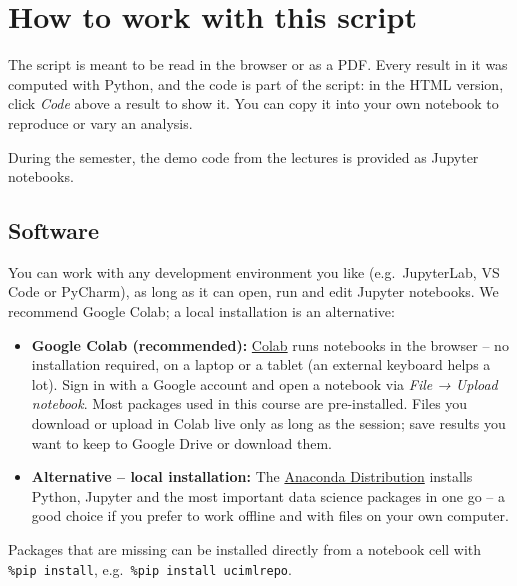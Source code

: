 \documentclass[
  letterpaper,
  DIV=11,
  numbers=noendperiod]{scrreprt}
\providecommand{\tightlist}{%
  \setlength{\itemsep}{0pt}\setlength{\parskip}{0pt}}\usepackage{longtable,booktabs,array}
\begin{document}
\section*{How to work with this
script}\label{how-to-work-with-this-script}


The script is meant to be read in the browser or as a PDF. Every result
in it was computed with Python, and the code is part of the script: in
the HTML version, click \emph{Code} above a result to show it. You can
copy it into your own notebook to reproduce or vary an analysis.

During the semester, the demo code from the lectures is provided as
Jupyter notebooks.

\subsection*{Software}\label{software}

You can work with any development environment you like (e.g.~JupyterLab,
VS Code or PyCharm), as long as it can open, run and edit Jupyter
notebooks. We recommend Google Colab; a local installation is an
alternative:

\begin{itemize}
\tightlist
\item
  \textbf{Google Colab (recommended):}
  \href{https://colab.research.google.com}{Colab} runs notebooks in the
  browser -- no installation required, on a laptop or a tablet (an
  external keyboard helps a lot). Sign in with a Google account and open
  a notebook via \emph{File → Upload notebook}. Most packages used in
  this course are pre-installed. Files you download or upload in Colab
  live only as long as the session; save results you want to keep to
  Google Drive or download them.
\item
  \textbf{Alternative -- local installation:} The
  \href{https://www.anaconda.com/download}{Anaconda Distribution}
  installs Python, Jupyter and the most important data science packages
  in one go -- a good choice if you prefer to work offline and with
  files on your own computer.
\end{itemize}

Packages that are missing can be installed directly from a notebook cell
with \texttt{\%pip\ install}, e.g.~\texttt{\%pip\ install\ ucimlrepo}.
\end{document}
